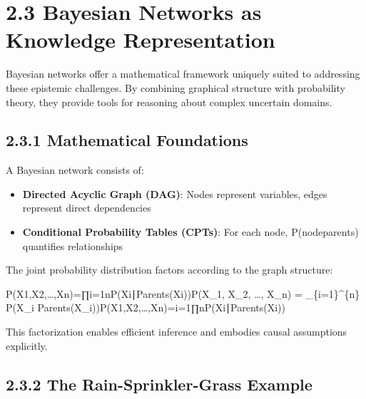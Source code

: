 \documentclass[
  11pt,
  letterpaper,
]{book}
\providecommand{\tightlist}{%
  \setlength{\itemsep}{0pt}\setlength{\parskip}{0pt}}
\begin{document}
\section*{2.3 Bayesian Networks as Knowledge
Representation}\label{sec-bayesian-networks}


Bayesian networks offer a mathematical framework uniquely suited to
addressing these epistemic challenges. By combining graphical structure
with probability theory, they provide tools for reasoning about complex
uncertain domains.

\subsection*{2.3.1 Mathematical
Foundations}\label{sec-mathematical-foundations}

A Bayesian network consists of:

\begin{itemize}
\tightlist
\item
  \textbf{Directed Acyclic Graph (DAG)}: Nodes represent variables,
  edges represent direct dependencies
\item
  \textbf{Conditional Probability Tables (CPTs)}: For each node,
  P(node\textbar parents) quantifies relationships
\end{itemize}

The joint probability distribution factors according to the graph
structure:

P(X1,X2,\ldots,Xn)=∏i=1nP(Xi∣Parents(Xi))P(X\_1, X\_2, \ldots, X\_n) =
\prod\_\{i=1\}\^{}\{n\} P(X\_i \textbar{}
Parents(X\_i))P(X1\hspace{0pt},X2\hspace{0pt},\ldots,Xn\hspace{0pt})=i=1∏n\hspace{0pt}P(Xi\hspace{0pt}∣Parents(Xi\hspace{0pt}))

This factorization enables efficient inference and embodies causal
assumptions explicitly.

\subsection*{2.3.2 The Rain-Sprinkler-Grass
Example}\label{sec-rain-sprinkler-example}
\end{document}
